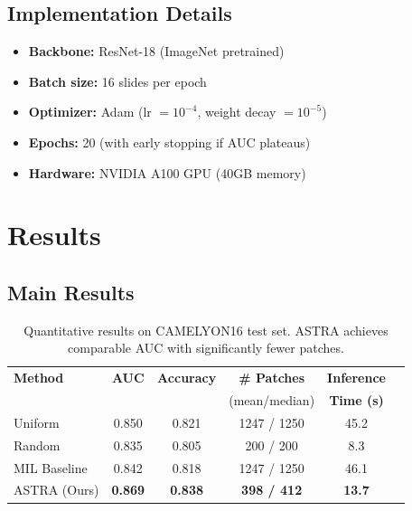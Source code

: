 \documentclass[runningheads]{llncs}
\begin{document}
\subsection{Implementation Details}

\begin{itemize}

\item \textbf{Backbone:} ResNet-18 (ImageNet pretrained)

\item \textbf{Batch size:} 16 slides per epoch

\item \textbf{Optimizer:} Adam (lr $= 10^{-4}$, weight decay $= 10^{-5}$)

\item \textbf{Epochs:} 20 (with early stopping if AUC plateaus)

\item \textbf{Hardware:} NVIDIA A100 GPU (40GB memory)

\end{itemize}

\section{Results}

\label{sec:results}

\subsection{Main Results}

\begin{table}[h]
\centering
\caption{Quantitative results on CAMELYON16 test set. ASTRA achieves comparable AUC with significantly fewer patches.}
\label{tab:main_results}
\begin{tabular}{lccccc}
\toprule
\textbf{Method} & \textbf{AUC} & \textbf{Accuracy} & \textbf{\# Patches} & \textbf{Inference} \\
& & & (mean/median) & \textbf{Time (s)} \\
\midrule
Uniform & 0.850 & 0.821 & 1247 / 1250 & 45.2 \\
Random & 0.835 & 0.805 & 200 / 200 & 8.3 \\
MIL Baseline & 0.842 & 0.818 & 1247 / 1250 & 46.1 \\
\midrule
ASTRA (Ours) & \textbf{0.869} & \textbf{0.838} & \textbf{398 / 412} & \textbf{13.7} \\
\bottomrule
\end{tabular}
\end{table}
\end{document}
